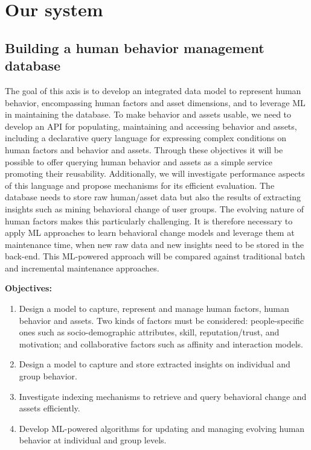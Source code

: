 \documentclass[11pt]{article}
\begin{document}
\section{Our system}

\subsection{Building a human behavior management database} 
The goal of this axis is to develop an
integrated data model to represent human behavior, encompassing  human factors and asset dimensions, and to leverage ML in maintaining the database. To make behavior and assets usable, we need to develop an API for populating, maintaining and accessing 
behavior and assets, including a declarative query language for expressing
complex conditions on human factors and behavior and assets. Through these objectives it will
be possible to offer querying human behavior and assets as a simple service promoting their 
reusability. Additionally, we will
investigate performance aspects of this language and propose
mechanisms for its efficient evaluation. The database needs to store raw human/asset data but also the results of extracting insights such as mining behavioral change of user groups. The evolving nature of human
factors makes this particularly challenging. It is therefore necessary to apply ML approaches to learn behavioral change models and leverage them at maintenance time, when new raw data and new insights need to be stored in the back-end. This ML-powered approach will be compared against traditional batch and incremental maintenance approaches.  

{\bf Objectives:}
\begin{enumerate}
\item Design a model to capture, represent and manage human factors, human behavior and assets. Two kinds of factors must
be considered: people-specific ones such as socio-demographic attributes, skill,
reputation/trust, and motivation;
and collaborative factors such as affinity and interaction
models. 
\item Design a model to capture and store extracted insights on individual and group behavior.
\item Investigate indexing mechanisms to retrieve and query  
behavioral change and assets efficiently.
\item Develop ML-powered algorithms for updating and
managing evolving human behavior at individual and group levels.
\end{enumerate}
\end{document}
